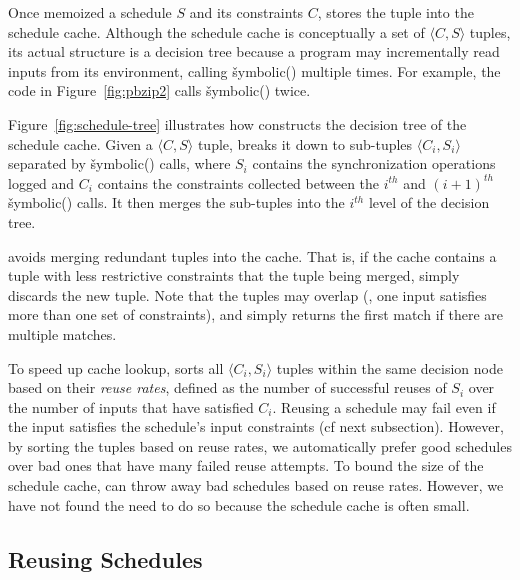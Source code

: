 Once \tern memoized a schedule $S$ and its constraints $C$, \tern stores the
tuple into the schedule cache.  Although the schedule cache is
conceptually a set of $\langle C, S \rangle$ tuples, its actual structure
is a decision tree because a program may incrementally read inputs from
its environment, calling \v{symbolic()} multiple times.  For example, the
code in Figure~\ref{fig:pbzip2} calls \v{symbolic()} twice.

Figure~\ref{fig:schedule-tree} illustrates how \tern constructs the
decision tree of the schedule cache.  Given a $\langle C, S \rangle$
tuple, \tern breaks it down to sub-tuples $\langle C_i, S_i \rangle$
separated by \v{symbolic()} calls, where $S_i$ contains the
synchronization operations logged and $C_i$ contains the constraints
collected between the $i^{th}$ and $(i+1)^{th}$ \v{symbolic()} calls.  It
then merges the sub-tuples into the $i^{th}$ level of the decision tree.

\tern avoids merging redundant tuples into the cache.  That is, if the
cache contains a tuple with less restrictive constraints that the tuple
being merged, \tern simply discards the new tuple.  Note that the tuples
may overlap (\ie, one input satisfies more than one set of constraints),
and \tern simply returns the first match if there are multiple matches.

To speed up cache lookup, \tern sorts all $\langle C_i, S_i \rangle$ tuples
within the same decision node based on their \emph{reuse rates}, defined
as the number of successful reuses of $S_i$ over the number of inputs that
have satisfied $C_i$.  Reusing a schedule may fail even if the input
satisfies the schedule's input constraints (cf next subsection).  However,
by sorting the tuples based on reuse rates, we automatically prefer good
schedules over bad ones that have many failed reuse attempts.  To bound
the size of the schedule cache, \tern can throw away bad schedules based on
reuse rates.  However, we have not found the need to do so because
the schedule cache is often small.



\subsection{Reusing Schedules} \label{sec:reuse-schedule}

